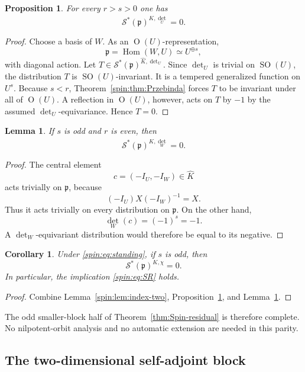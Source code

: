\documentclass[11pt,reqno]{amsart}
\numberwithin{equation}{section}
\newtheorem{proposition}[theorem]{Proposition}
\newtheorem{lemma}[theorem]{Lemma}
\newtheorem{corollary}[theorem]{Corollary}
\theoremstyle{definition}
\theoremstyle{remark}
\newcommand{\SO}{\operatorname{SO}}
\newcommand{\Or}{\operatorname{O}}
\newcommand{\Hom}{\operatorname{Hom}}
\newcommand{\fp}{\mathfrak p}
\newcommand{\cS}{\mathcal S}
\begin{document}
\begin{proposition}\label{spin:prop:detU-vanish}
For every $r>s>0$ one has
\[
  \cS^*(\fp)^{\widehat K,\det_U}=0.
\]
\end{proposition}

\begin{proof}
Choose a basis of $W$.  As an $\Or(U)$-representation,
\[
  \fp=\Hom(W,U)\simeq U^{\oplus s},
\]
with diagonal action.  Let
$T\in\cS^*(\fp)^{\widehat K,\det_U}$.  Since $\det_U$ is trivial on
$\SO(U)$, the distribution $T$ is $\SO(U)$-invariant.  It is a tempered
generalized function on $U^s$.  Because $s<r$, Theorem~\ref{spin:thm:Przebinda}
forces $T$ to be invariant under all of $\Or(U)$.  A reflection in $\Or(U)$,
however, acts on $T$ by $-1$ by the assumed $\det_U$-equivariance.  Hence
$T=0$.
\end{proof}

\begin{lemma}\label{spin:lem:detW-odd}
If $s$ is odd and $r$ is even, then
\[
  \cS^*(\fp)^{\widehat K,\det_W}=0.
\]
\end{lemma}

\begin{proof}
The central element
\[
  c=(-I_U,-I_W)\in\widehat K
\]
acts trivially on $\fp$, because
\[
  (-I_U)X(-I_W)^{-1}=X.
\]
Thus it acts trivially on every distribution on $\fp$.  On the other hand,
\[
  \det_W(c)=(-1)^s=-1.
\]
A $\det_W$-equivariant distribution would therefore be equal to its negative.
\end{proof}

\begin{corollary}\label{spin:cor:odd-sign-zero}
Under \eqref{spin:eq:standing}, if $s$ is odd, then
\[
  \cS^*(\fp)^{K,\chi}=0.
\]
In particular, the implication \eqref{spin:eq:SR} holds.
\end{corollary}

\begin{proof}
Combine Lemma~\ref{spin:lem:index-two}, Proposition~\ref{spin:prop:detU-vanish}, and
Lemma~\ref{spin:lem:detW-odd}.
\end{proof}

The odd smaller-block half of Theorem~\ref{thm:Spin-residual} is therefore complete.
No nilpotent-orbit analysis and no automatic extension are needed in this
parity.

\subsection{The two-dimensional self-adjoint block}\label{spin:sec:ranktwo}
\end{document}
